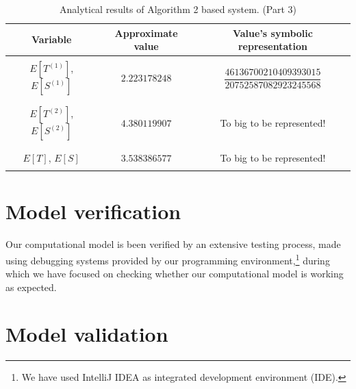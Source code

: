 \documentclass[10pt,a4paper]{article}
\begin{document}
\begin{table}[h!]
\caption{Analytical results of Algorithm 2 based system. (Part 3)}
\begin{adjustbox}{center=\textwidth}
	
     \begin{tabular}{c|c|c}
     \toprule
     \textbf{Variable} & \textbf{Approximate value} & \textbf{Value's symbolic representation} \\
     \toprule
	 
	 &&\\


	 $E[T^{(1)}]$, $E[S^{(1)}]$ & $2.223178248$ & $\dfrac{46136700210409393015}{20752587082923245568}$  \\

	 &&\\\hline &&\\

	 $E[T^{(2)}]$, $E[S^{(2)}]$ & $4.380119907$ & To big to be represented!  \\

	 &&\\\hline &&\\

	 $E[T]$, $E[S]$ & $3.538386577$ & To big to be represented!  \\

	 &&\\

     \bottomrule

    \end{tabular}
    \end{adjustbox}
\end{table}


\clearpage
\newpage
\section{Model verification}

Our computational model is been verified by an extensive testing process, made using debugging systems provided by our programming environment,\footnote{We have used IntelliJ IDEA as integrated development environment (IDE).} during which we have focused on checking whether our computational model is working as expected.

\section{Model validation}\label{sec:ModelValidation}
\end{document}
